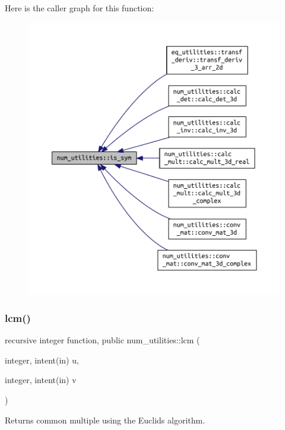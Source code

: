 Here is the caller graph for this function\+:
\nopagebreak
\begin{figure}[H]
\begin{center}
\leavevmode
\includegraphics[width=350pt]{namespacenum__utilities_a4e6994b5c92b3d16c8538b54db0beadd_icgraph}
\end{center}
\end{figure}
\mbox{\label{namespacenum__utilities_a33fc1483c840d5d3f9b12acfce21cad1}} 
\subsubsection{\texorpdfstring{lcm()}{lcm()}}
{\footnotesize\ttfamily recursive integer function, public num\+\_\+utilities\+::lcm (\begin{DoxyParamCaption}\item[{integer, intent(in)}]{u,  }\item[{integer, intent(in)}]{v }\end{DoxyParamCaption})}



Returns common multiple using the Euclid\textquotesingle{}s algorithm. 


